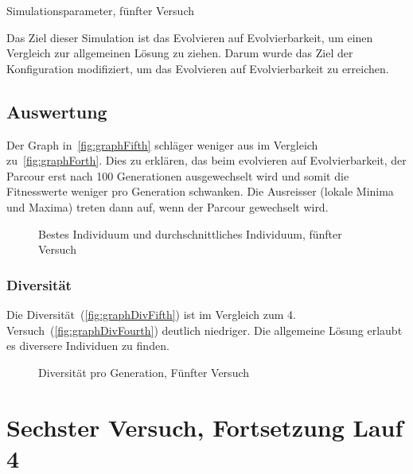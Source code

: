       \begin{table}[H]
        \centering
        
        \caption{Simulationsparameter, fünfter Versuch}
      \end{table}

      Das Ziel dieser Simulation ist das Evolvieren auf Evolvierbarkeit,
      um einen Vergleich zur allgemeinen Lösung zu ziehen.
      Darum wurde das Ziel der Konfiguration modifiziert, um das Evolvieren auf Evolvierbarkeit zu erreichen.

    \subsection{Auswertung\label{sub:fifthAuswertung}}

      Der Graph in~\vref{fig:graphFifth} schläger weniger aus im Vergleich zu~\vref{fig:graphForth}.
      Dies zu erklären, das beim evolvieren auf Evolvierbarkeit, der Parcour erst nach 100
      Generationen ausgewechselt wird und somit die Fitnesswerte weniger pro Generation schwanken.
      Die Ausreisser (lokale Minima und Maxima) treten dann auf, wenn der Parcour gewechselt wird.

      \begin{figure}[H]
        \centering
        
        \caption{Bestes Individuum und durchschnittliches Individuum, fünfter Versuch\label{fig:graphFifth}}
      \end{figure}

      \subsubsection{Diversität}

        Die Diversität~(\vref{fig:graphDivFifth}) ist im Vergleich zum 4. Versuch~(\vref{fig:graphDivFourth}) deutlich niedriger.
        Die allgemeine Lösung erlaubt es diversere Individuen zu finden.

        \begin{figure}[H]
          \centering
          
          \caption{Diversität pro Generation, Fünfter Versuch\label{fig:graphDivFifth}}
        \end{figure}

  \section{Sechster Versuch, Fortsetzung Lauf 4\label{sec:sixthSimulation}}
